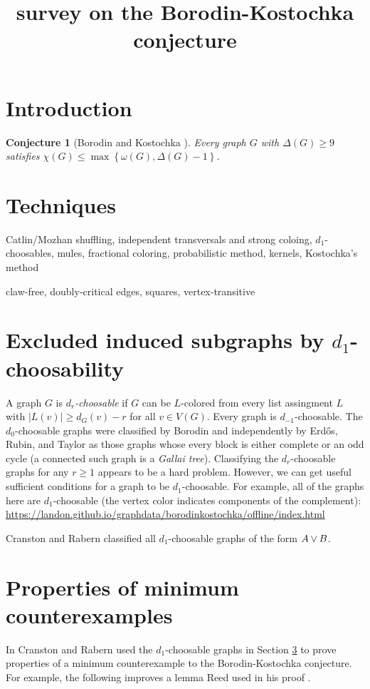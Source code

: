 \documentclass[12pt]{article}
\title{survey on the Borodin-Kostochka conjecture}
\author{}
\theoremstyle{plain}
\newtheorem{conjecture}[thm]{Conjecture}
\theoremstyle{definition}
\theoremstyle{remark}
\newcommand{\set}[1]{\left\{ #1 \right\}}
\newcommand{\card}[1]{\left|#1\right|}
\newcommand{\join}[2]{#1 \mbox{\hspace{2 pt}$\vee$\hspace{2 pt}} #2}
\begin{document}
\maketitle

\section{Introduction}
\begin{conjecture}[Borodin and Kostochka \cite{borodin1977upper}]
Every graph $G$ with $\Delta(G) \ge 9$ satisfies $\chi(G) \le \max\set{\omega(G), \Delta(G) - 1}$.
\end{conjecture}

\section{Techniques}
Catlin/Mozhan shuffling, independent transversals and strong coloing, $d_1$-choosables, mules, fractional coloring, probabilistic method, kernels, Kostochka's method

claw-free, doubly-critical edges, squares, vertex-transitive

\section{Excluded induced subgraphs by $d_1$-choosability}\label{d1choosable}
A graph $G$ is \emph{$d_r$-choosable} if $G$ can be $L$-colored from every list assingment $L$ with $\card{L(v)} \ge d_G(v) - r$ for all $v \in V(G)$.
Every graph is $d_{-1}$-choosable.  
The $d_0$-choosable graphs were classified by Borodin \cite{borodin1977criterion} and independently by Erd\H{o}s, Rubin, and Taylor \cite{erdos1979choosability} as those
graphs whose every block is either complete or an odd cycle (a connected such graph is a \emph{Gallai tree}).  Classifying the $d_r$-choosable graphs for any $r \ge 1$ appears
to be a hard problem.  However, we can get useful sufficient conditions for a graph to be $d_1$-choosable.  For example, all of the graphs here are $d_1$-choosable (the vertex color indicates
components of the complement): \url{https://landon.github.io/graphdata/borodinkostochka/offline/index.html}

Cranston and Rabern \cite{mules} classified all $d_1$-choosable graphs of the form $\join{A}{B}$.

\section{Properties of minimum counterexamples}\label{mules}
In \cite{cranstonrabernapriori} Cranston and Rabern used the $d_1$-choosable graphs in Section \ref{d1choosable} to prove properties 
of a minimum counterexample to the Borodin-Kostochka conjecture.  For example, the following improves a lemma Reed used in his proof \cite{reed1999strengthening}.
\end{document}
